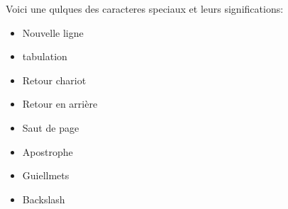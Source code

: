 \documentclass[letterpaper,10pt,french]{sphinxmanual}
\begin{document}
\sphinxAtStartPar
Voici une qulques des caracteres speciaux et leurs significations:
\begin{itemize}
\item {} 
\sphinxAtStartPar
{} \sphinxhyphen{} Nouvelle ligne

\item {} 
\sphinxAtStartPar
{} \sphinxhyphen{} tabulation

\item {} 
\sphinxAtStartPar
{} \sphinxhyphen{} Retour chariot

\item {} 
\sphinxAtStartPar
{} \sphinxhyphen{} Retour en arrière

\item {} 
\sphinxAtStartPar
{} \sphinxhyphen{} Saut de page

\item {} 
\sphinxAtStartPar
\sphinxcode{\sphinxupquote{\textbackslash{}\textquotesingle{}}} \sphinxhyphen{} Apostrophe

\item {} 
\sphinxAtStartPar
{} \sphinxhyphen{} Guiellmets

\item {} 
\sphinxAtStartPar
\sphinxcode{\sphinxupquote{\textbackslash{}\textbackslash{}}} \sphinxhyphen{}Backslash

\end{itemize}
\end{document}
